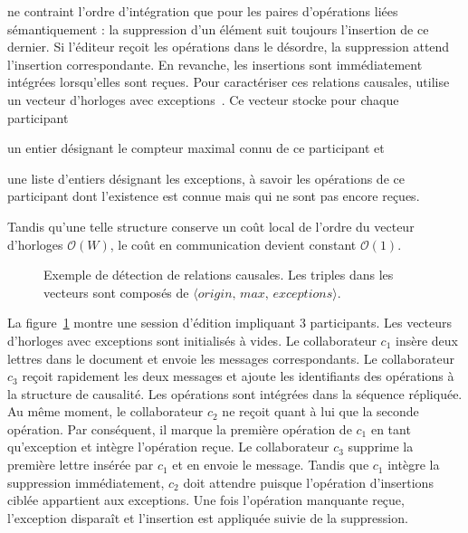 
\CRATE ne contraint l'ordre d'intégration que pour les paires d'opérations liées
sémantiquement : la suppression d'un élément suit toujours l'insertion de ce
dernier. Si l'éditeur reçoit les opérations dans le désordre, la suppression
attend l'insertion correspondante. En revanche, les insertions sont
immédiatement intégrées lorsqu'elles sont reçues. Pour caractériser ces
relations causales, \CRATE utilise un vecteur d'horloges avec
exceptions~\cite{malkhi2007concise, mukund2014optimized}. Ce vecteur stocke pour
chaque participant
\begin{inparaenum}[(i)]
\item un entier désignant le compteur maximal connu de ce participant et
\item une liste d'entiers désignant les exceptions, à savoir les opérations de
  ce participant dont l'existence est connue mais qui ne sont pas encore
  reçues.
\end{inparaenum}
Tandis qu'une telle structure conserve un coût local de l'ordre du vecteur
d'horloges $\mathcal{O}(W)$, le coût en communication devient constant
$\mathcal{O}(1)$.

\begin{figure}
  \begin{center}
    
    \caption[Exemple de détection de relations causales]
    {\label{editor:fig:timeline}Exemple de détection de relations causales. Les
      triples dans les vecteurs sont composés de
      $\langle origin,\, max,\, exceptions\rangle$.}
  \end{center}
\end{figure}

La figure~\ref{editor:fig:timeline} montre une session d'édition impliquant 3
participants. Les vecteurs d'horloges avec exceptions sont initialisés à
vides. Le collaborateur $c_1$ insère deux lettres dans le document et envoie les
messages correspondants. Le collaborateur $c_3$ reçoit rapidement les deux
messages et ajoute les identifiants des opérations à la structure de
causalité. Les opérations sont intégrées dans la séquence répliquée. Au même
moment, le collaborateur $c_2$ ne reçoit quant à lui que la seconde
opération. Par conséquent, il marque la première opération de $c_1$ en tant
qu'exception et intègre l'opération reçue. Le collaborateur $c_3$ supprime la
première lettre insérée par $c_1$ et en envoie le message. Tandis que $c_1$
intègre la suppression immédiatement, $c_2$ doit attendre puisque l'opération
d'insertions ciblée appartient aux exceptions. Une fois l'opération manquante
reçue, l'exception disparaît et l'insertion est appliquée suivie de la
suppression.

